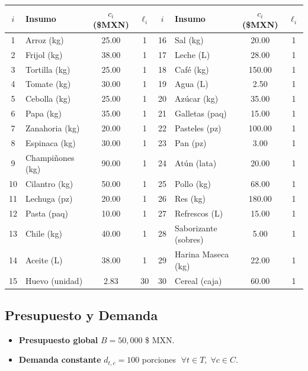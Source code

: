 \documentclass[12pt, letterpaper]{article}
\begin{document}
\begin{longtable}{clcc|clcc}
\toprule
$i$ & \textbf{Insumo} & $c_i$ (\$MXN) & $\ell_i$ & $i$ & \textbf{Insumo} & $c_i$ (\$MXN) & $\ell_i$ \\
\midrule
\endhead
1  & Arroz (kg)           & 25.00  & 1  & 16 & Sal (kg)             & 20.00  & 1 \\
2  & Frijol (kg)          & 38.00  & 1  & 17 & Leche (L)            & 28.00  & 1 \\
3  & Tortilla (kg)        & 25.00  & 1  & 18 & Café (kg)            & 150.00 & 1 \\
4  & Tomate (kg)          & 30.00  & 1  & 19 & Agua (L)             & 2.50   & 1 \\
5  & Cebolla (kg)         & 25.00  & 1  & 20 & Azúcar (kg)          & 35.00  & 1 \\
6  & Papa (kg)            & 35.00  & 1  & 21 & Galletas (paq)       & 15.00  & 1 \\
7  & Zanahoria (kg)       & 20.00  & 1  & 22 & Pasteles (pz)        & 100.00 & 1 \\
8  & Espinaca (kg)        & 30.00  & 1  & 23 & Pan (pz)             & 3.00   & 1 \\
9  & Champiñones (kg)     & 90.00  & 1  & 24 & Atún (lata)          & 20.00  & 1 \\
10 & Cilantro (kg)        & 50.00  & 1  & 25 & Pollo (kg)           & 68.00  & 1 \\
11 & Lechuga (pz)         & 20.00  & 1  & 26 & Res (kg)             & 180.00 & 1 \\
12 & Pasta (paq)          & 10.00  & 1  & 27 & Refrescos (L)        & 15.00  & 1 \\
13 & Chile (kg)           & 40.00  & 1  & 28 & Saborizante (sobres) & 5.00   & 1 \\
14 & Aceite (L)           & 38.00  & 1  & 29 & Harina Maseca (kg)   & 22.00  & 1 \\
15 & Huevo (unidad)       & 2.83   & 30 & 30 & Cereal (caja)        & 60.00  & 1 \\
\bottomrule
\end{longtable}

\subsection{Presupuesto y Demanda}

\begin{itemize}
  \item \textbf{Presupuesto global} $B = 50{,}000$ \$ MXN.
  \item \textbf{Demanda constante} $d_{t,c} = 100$ porciones $\;\forall t \in T,\; \forall c \in C$.
\end{itemize}
\end{document}
